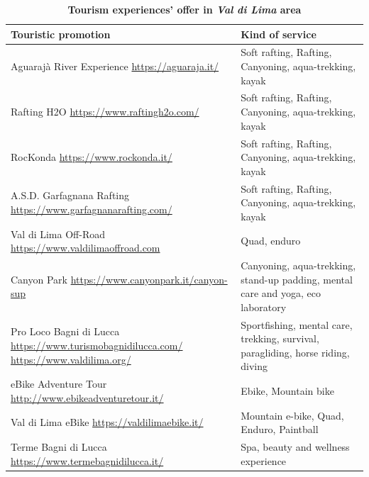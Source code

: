 \documentclass[sustainability,article,submit,pdftex,moreauthors]{Definitions/mdpi}
\begin{document}
\begin{table}
    \centering
    \begin{tabular}{|p{70mm}||p{45mm}|} \hline 
         {\bf Touristic promotion }&  {\bf Kind of service}\\
         \hline \hline 
         Aguarajà River Experience \newline \url{https://aguaraja.it/}& Soft rafting, Rafting, Canyoning, aqua-trekking, kayak\\
         \hline 
         Rafting H2O \newline \url{https://www.raftingh2o.com/}& Soft rafting, Rafting, Canyoning, aqua-trekking, kayak\\
         \hline 
         RocKonda \newline \url{https://www.rockonda.it/}& Soft rafting, Rafting, Canyoning, aqua-trekking, kayak\\ \hline 
         A.S.D. Garfagnana Rafting \newline \url{https://www.garfagnanarafting.com/}& Soft rafting, Rafting, Canyoning, aqua-trekking, kayak\\ 
        \hline 
         Val di Lima Off-Road \newline \url{https://www.valdilimaoffroad.com} & Quad, enduro\\ \hline 
         Canyon Park \newline \url{https://www.canyonpark.it/canyon-sup}& Canyoning, aqua-trekking, stand-up padding, mental care and yoga, eco laboratory\\
         \hline 
         Pro Loco Bagni di Lucca \newline  \url{https://www.turismobagnidilucca.com/} \newline \url{https://www.valdilima.org/}& Sportfishing, mental care, trekking, survival, paragliding, horse riding, diving\\
         \hline 
         eBike Adventure Tour \newline \url{http://www.ebikeadventuretour.it/}& Ebike, Mountain bike\\ \hline 
         Val di Lima eBike \newline  \url{https://valdilimaebike.it/} & Mountain e-bike, Quad, Enduro, Paintball\\
         \hline 
        Terme Bagni di Lucca \newline \url{https://www.termebagnidilucca.it/} &Spa, beauty and wellness experience\\
        \hline
    \end{tabular}
    \caption{\textbf{Tourism experiences’ offer in \emph{Val di Lima} area }}
    \label{tab:experience}
\end{table}
\end{document}
